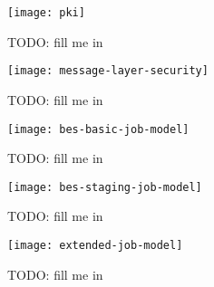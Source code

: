 \begin{figure}
  \begin{center}
    \texttt{[image: pki]}
  \end{center}
  \caption[Public Key Infrastructure]{TODO: fill me in}
  \label{fig:net-pki}
\end{figure}

\begin{figure}
  \begin{center}
    \texttt{[image: message-layer-security]}
  \end{center}
  \caption[Message Layer Security]{TODO: fill me in}
  \label{fig:net-mls}
\end{figure}

\begin{figure}
  \begin{center}
    \texttt{[image: bes-basic-job-model]}
  \end{center}
  \caption[BES Basic State Model]{TODO: fill me in}
  \label{fig:bes-basic}
\end{figure}

\begin{figure}
  \begin{center}
    \texttt{[image: bes-staging-job-model]}
  \end{center}
  \caption[BES State Model Staging Extension]{TODO: fill me in}
  \label{fig:bes-staging}
\end{figure}

\begin{figure}
  \begin{center}
    \texttt{[image: extended-job-model]}
  \end{center}
  \caption[Job Model (extended)]{TODO: fill me in}
  \label{fig:bes-extended}
\end{figure}

